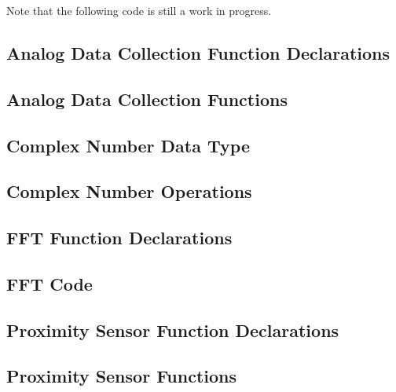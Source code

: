 \documentclass[10pt]{article}           %
\begin{document}
Note that the following code is still a work in progress.

\subsection{Analog Data Collection Function Declarations}
\label{sub:data_collection_function_declarations}



\subsection{Analog Data Collection Functions}
\label{sub:analog_data_collection_functions}



\subsection{Complex Number Data Type}
\label{sub:complex_number_data_type}



\subsection{Complex Number Operations}
\label{sub:complex_number_operations}



\subsection{FFT Function Declarations}
\label{sub:fft_function_declarations}



\subsection{FFT Code}
\label{sub:fft_code}



\subsection{Proximity Sensor Function Declarations}
\label{sub:proximity_sensor_function_declarations}



\subsection{Proximity Sensor Functions}
\label{sub:proximity_sensor_functions}


\end{document}
